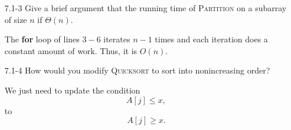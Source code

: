 \documentclass{report}
\makeatletter
\renewenvironment{framed}{%
 \def\FrameCommand##1{\hskip\@totalleftmargin
 \fboxsep=\FrameSep\fbox{##1}}%
 \MakeFramed {\advance\hsize-\width
   \@totalleftmargin\z@ \linewidth\hsize
   \@setminipage}}%
 {\par\unskip\endMakeFramed}
\makeatother
\begin{document}
\begin{enumerate}
\item[7.1{-}3]{Give a brief argument that the running time of \textsc{Partition}
on a subarray of size $n$ if $\Theta(n)$.}

\begin{framed}
The \textbf{for} loop of lines $3{-}6$ iterates $n - 1$ times and each
iteration does a constant amount of work. Thus, it is $O(n)$.
\end{framed}

\item[7.1{-}4]{How would you modify \textsc{Quicksort} to sort into
nonincreasing order?}

\begin{framed}
We just need to update the condition
\[
  A[j] \le x,
\]
to
\[
  A[j] \ge x.
\]
\end{framed}

\end{enumerate}
\end{document}
